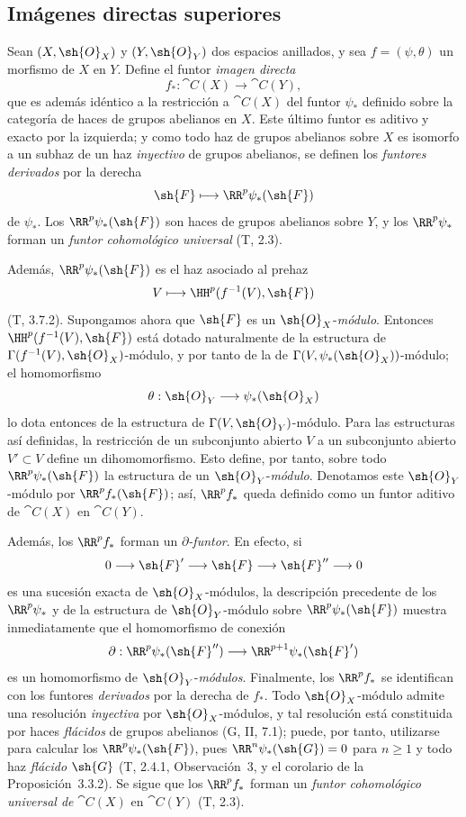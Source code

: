 \documentclass[oneside]{amsart}
\renewcommand{\geq}{\geqslant}
\let\EGAOriginalLabel\label
\renewcommand{\label}[1]{\phantomsection\EGAOriginalLabel{#1}}
\newcommand{\EGAUnavailableHyperref}[2]{#2}
\begin{document}
\subsection{Imágenes directas superiores}
\label{subsection:0.12.2}

\begin{env}[12.2.1]
\label{0.12.2.1}
Sean $(X,\sh{O}_X)$ y $(Y,\sh{O}_Y)$ dos espacios anillados, y sea
$f=(\psi,\theta)$ un morfismo de $X$ en $Y$.  Define el funtor \emph{imagen
directa}
\[
  f_*:\cat{C}(X)\longrightarrow\cat{C}(Y),
\]
que es además idéntico a la restricción a $\cat{C}(X)$ del
funtor $\psi_*$ definido sobre la categoría de haces de grupos abelianos
en $X$.
Este último funtor es aditivo y exacto por la izquierda; y como todo haz de
grupos abelianos sobre $X$ es isomorfo a un subhaz de un haz \emph{inyectivo}
de grupos abelianos, se definen los \emph{funtores derivados} por la derecha
\[
  \sh{F}\longmapsto\RR^p\psi_*(\sh{F})
\]
de $\psi_*$.  Los $\RR^p\psi_*(\sh{F})$ son haces de grupos abelianos
sobre $Y$, y los $\RR^p\psi_*$ forman un \emph{funtor cohomológico universal}
(T, 2.3).

Además, $\RR^p\psi_*(\sh{F})$ es el haz asociado al
prehaz
\[
  V\longmapsto\HH^p(f^{-1}(V),\sh{F})
\]
(T, 3.7.2).
Supongamos ahora que $\sh{F}$ es un $\sh{O}_X$-\emph{módulo}.
Entonces $\HH^p(f^{-1}(V),\sh{F})$ está dotado naturalmente de la estructura
de $\Gamma(f^{-1}(V),\sh{O}_X)$-módulo, y por tanto de la de
$\Gamma(V,\psi_*(\sh{O}_X))$-módulo; el homomorfismo
\[
  \theta:\sh{O}_Y\longrightarrow\psi_*(\sh{O}_X)
\]
lo dota entonces de la estructura de
$\Gamma(V,\sh{O}_Y)$-módulo.
Para las estructuras así definidas, la restricción de un subconjunto abierto
$V$ a un subconjunto abierto $V'\subset V$ define un dihomomorfismo.  Esto
define, por tanto, sobre todo $\RR^p\psi_*(\sh{F})$ la estructura de un
$\sh{O}_Y$-\emph{módulo}.  Denotamos este $\sh{O}_Y$-módulo por
$\RR^p f_*(\sh{F})$; así, $\RR^p f_*$ queda definido como un funtor
aditivo de $\cat{C}(X)$ en $\cat{C}(Y)$.

Además, los $\RR^p f_*$ forman un \emph{$\partial$-funtor}.  En efecto, si
\[
  0\longrightarrow\sh{F}'\longrightarrow\sh{F}
  \longrightarrow\sh{F}''\longrightarrow0
\]
es una sucesión exacta de $\sh{O}_X$-módulos, la descripción precedente
de los $\RR^p\psi_*$ y de la estructura de $\sh{O}_Y$-módulo sobre
$\RR^p\psi_*(\sh{F})$ muestra inmediatamente que el homomorfismo de conexión
\[
  \partial:\RR^p\psi_*(\sh{F}'')
  \longrightarrow\RR^{p+1}\psi_*(\sh{F}')
\]
es un homomorfismo de $\sh{O}_Y$-\emph{módulos}.
Finalmente, los $\RR^p f_*$ se identifican con los funtores \emph{derivados} por la
derecha de $f_*$.  Todo $\sh{O}_X$-módulo admite una resolución \emph{inyectiva} por
$\sh{O}_X$-módulos, y tal resolución está constituida por haces \emph{flácidos}
de grupos abelianos (G, II, 7.1); puede, por tanto, utilizarse para calcular
los $\RR^p\psi_*(\sh{F})$, pues $\RR^n\psi_*(\sh{G})=0$ para $n\geq1$
y todo haz \emph{flácido} $\sh{G}$ (T, 2.4.1, Observación~3, y el
 corolario de la Proposición~\EGAUnavailableHyperref{0.3.3.2}{3.3.2}).
Se sigue que los $\RR^p f_*$ forman un \emph{funtor cohomológico universal
de} $\cat{C}(X)$ en $\cat{C}(Y)$ (T, 2.3).
\end{env}
\end{document}
